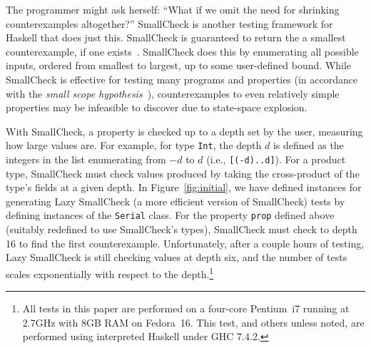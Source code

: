 \documentclass[10pt]{sigplanconf}
\newcommand{\ttp}[1]{\texttt{#1}}
\begin{document}
The programmer might ask herself: ``What if we omit the need for shrinking
counterexamples altogether?''  SmallCheck is another testing framework for
Haskell that does just this.  SmallCheck is guaranteed to return the a smallest
counterexample, if one exists~\cite{sc}.  SmallCheck does this by enumerating
all possible inputs, ordered from smallest to largest, up to some user-defined
bound.  While SmallCheck is effective for testing many programs and properties
(in accordance with the \emph{small scope hypothesis}~\cite{jackson}),
counterexamples to even relatively simple properties may be infeasible to
discover due to state-space explosion.

With SmallCheck, a property is checked up to a depth set by the user, measuring
how large values are.  For example, for type \ttp{Int}, the depth $d$ is defined
as the integers in the list enumerating from $-d$ to $d$ (i.e.,
\ttp{[(-d)..d]}).  For a product type, SmallCheck must check values produced by
taking the cross-product of the type's fields at a given depth.  In
Figure~\ref{fig:initial}, we have defined instances for generating Lazy
SmallCheck (a more efficient version of SmallCheck) tests by defining instances
of the \ttp{Serial} class.  For the property \ttp{prop} defined above (suitably
redefined to use SmallCheck's types), SmallCheck must check to depth 16 to find
the first counterexample.  Unfortunately, after a couple hours of testing, Lazy
SmallCheck is still checking values at depth six, and the number of tests scales
exponentially with respect to the depth.\footnote{All tests in this paper are
  performed on a four-core Pentium~i7 running at 2.7GHz with 8GB RAM on
  Fedora~16.  This test, and others unless noted, are performed using
  interpreted Haskell under GHC 7.4.2.}
\end{document}
